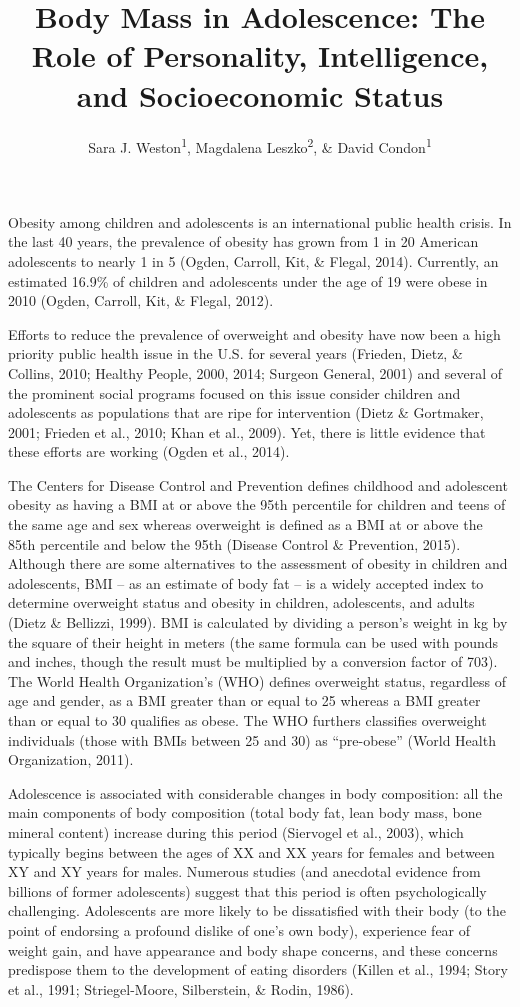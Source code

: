 \documentclass[man]{apa6}
\affiliation{
\vspace{0.5cm}
\textsuperscript{1} University of Oregon\\\textsuperscript{2} University of Szczecin}
\title{Body Mass in Adolescence: The Role of Personality, Intelligence, and Socioeconomic Status}
\author{Sara J. Weston\textsuperscript{1}, Magdalena Leszko\textsuperscript{2}, \& David Condon\textsuperscript{1}}
\date{}
\begin{document}
\maketitle

\setlength{\parskip}{0pt}
 \raggedbottom

Obesity among children and adolescents is an international public health crisis. In the last 40 years, the prevalence of obesity has grown from 1 in 20 American adolescents to nearly 1 in 5 (Ogden, Carroll, Kit, \& Flegal, 2014). Currently, an estimated 16.9\% of children and adolescents under the age of 19 were obese in 2010 (Ogden, Carroll, Kit, \& Flegal, 2012).

Efforts to reduce the prevalence of overweight and obesity have now been a high priority public health issue in the U.S. for several years (Frieden, Dietz, \& Collins, 2010; Healthy People, 2000, 2014; Surgeon General, 2001) and several of the prominent social programs focused on this issue consider children and adolescents as populations that are ripe for intervention (Dietz \& Gortmaker, 2001; Frieden et al., 2010; Khan et al., 2009). Yet, there is little evidence that these efforts are working (Ogden et al., 2014).

The Centers for Disease Control and Prevention defines childhood and adolescent obesity as having a BMI at or above the 95th percentile for children and teens of the same age and sex whereas overweight is defined as a BMI at or above the 85th percentile and below the 95th (Disease Control \& Prevention, 2015). Although there are some alternatives to the assessment of obesity in children and adolescents, BMI -- as an estimate of body fat -- is a widely accepted index to determine overweight status and obesity in children, adolescents, and adults (Dietz \& Bellizzi, 1999). BMI is calculated by dividing a person's weight in kg by the square of their height in meters (the same formula can be used with pounds and inches, though the result must be multiplied by a conversion factor of 703). The World Health Organization's (WHO) defines overweight status, regardless of age and gender, as a BMI greater than or equal to 25 whereas a BMI greater than or equal to 30 qualifies as obese. The WHO furthers classifies overweight individuals (those with BMIs between 25 and 30) as \enquote{pre-obese} (World Health Organization, 2011).

Adolescence is associated with considerable changes in body composition: all the main components of body composition (total body fat, lean body mass, bone mineral content) increase during this period (Siervogel et al., 2003), which typically begins between the ages of XX and XX years for females and between XY and XY years for males. Numerous studies (and anecdotal evidence from billions of former adolescents) suggest that this period is often psychologically challenging. Adolescents are more likely to be dissatisfied with their body (to the point of endorsing a profound dislike of one's own body), experience fear of weight gain, and have appearance and body shape concerns, and these concerns predispose them to the development of eating disorders (Killen et al., 1994; Story et al., 1991; Striegel-Moore, Silberstein, \& Rodin, 1986).
\end{document}
